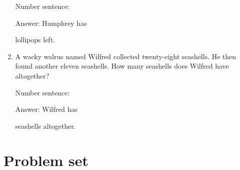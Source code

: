 \documentclass{tufte-book}
\begin{document}
\begin{enumerate}
  Number sentence:
  \dotfill\medskip\par
  Answer: Humphrey has
  \dotfill\medskip\par\mbox{}\dotfill\medskip\par\mbox{}\dotfill\bigskip
  lollipops left.
\item
  A wacky walrus named Wilfred collected twenty-eight seashells. He then
  found another eleven seashells. How many seashells does Wilfred have
  altogether?\medskip\par
  Number sentence:
  \dotfill\medskip\par
  Answer: Wilfred has
  \dotfill\medskip\par\mbox{}\dotfill\medskip\par\mbox{}\dotfill\bigskip
  seashells altogether.
\end{enumerate}



\clearpage\section{Problem set }
\end{document}
